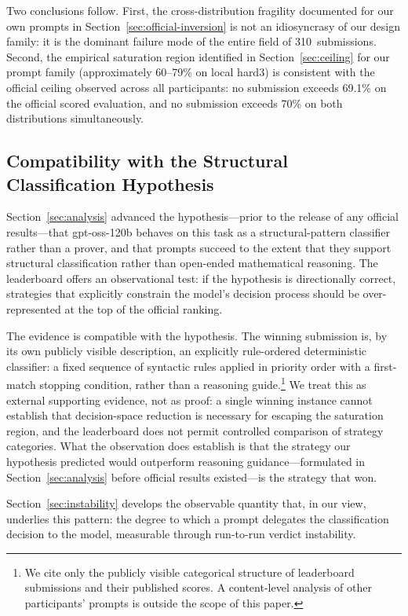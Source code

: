 Two conclusions follow. First, the cross-distribution fragility
documented for our own prompts in
Section~\ref{sec:official-inversion} is not an idiosyncrasy of our
design family: it is the dominant failure mode of the entire field of
310~submissions. Second, the empirical saturation region identified in
Section~\ref{sec:ceiling} for our prompt family (approximately
60--79\% on local hard3) is consistent with the official ceiling
observed across all participants: no submission exceeds 69.1\% on the
official scored evaluation, and no submission exceeds 70\% on both
distributions simultaneously.

\subsection{Compatibility with the Structural Classification Hypothesis}
\label{sec:official-router}

Section~\ref{sec:analysis} advanced the hypothesis---prior to the
release of any official results---that gpt-oss-120b behaves on this
task as a structural-pattern classifier rather than a prover, and that
prompts succeed to the extent that they support structural
classification rather than open-ended mathematical reasoning. The
leaderboard offers an observational test: if the hypothesis is
directionally correct, strategies that explicitly constrain the model's
decision process should be over-represented at the top of the official
ranking.

The evidence is compatible with the hypothesis. The winning submission
is, by its own publicly visible description, an explicitly rule-ordered
deterministic classifier: a fixed sequence of syntactic rules applied
in priority order with a first-match stopping condition, rather than a
reasoning guide.\footnote{We cite only the publicly visible
categorical structure of leaderboard submissions and their published
scores. A content-level analysis of other participants' prompts is
outside the scope of this paper.} We treat this as external supporting
evidence, not as proof: a single winning instance cannot establish
that decision-space reduction is necessary for escaping the saturation
region, and the leaderboard does not permit controlled comparison of
strategy categories. What the observation does establish is that the
strategy our hypothesis predicted would outperform reasoning
guidance---formulated in Section~\ref{sec:analysis} before official
results existed---is the strategy that won.

Section~\ref{sec:instability} develops the observable quantity that,
in our view, underlies this pattern: the degree to which a prompt
delegates the classification decision to the model, measurable through
run-to-run verdict instability.
